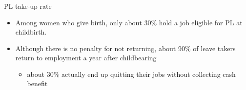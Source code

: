\documentclass[dvipdfmx,11pt]{beamer}
\begin{document}
\begin{frame}\frametitle{}
  PL take-up rate

  \begin{itemize}
    \begin{figure}[h]
      \centering
      \texttt{[image: 0619tanji\_fig/T5]}
      \label{T2}
    \end{figure}
    \footnotesize
    \item Among women who give birth, only about 30\% hold a job eligible for PL at childbirth.
    \item Although there is no penalty for not returning, about 90\% of leave takers return to employment a year after childbearing
    \begin{itemize}
      \item about 30\% actually end up quitting their jobs without collecting cash benefit
    \end{itemize}
  \end{itemize}
\end{frame}
\end{document}
